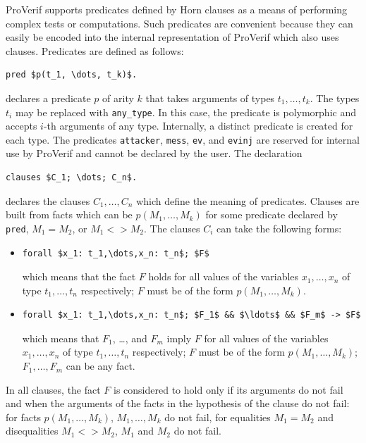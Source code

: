 \documentclass{book}
\begin{document}
ProVerif supports predicates defined by Horn clauses as a means of
performing complex tests or computations. Such predicates are
convenient because they can easily be encoded into the internal
representation of ProVerif which also uses clauses.
Predicates are defined as follows:
%
\begin{lstlisting}[numbers=none]
	pred $p(t_1, \dots, t_k)$.
\end{lstlisting}
%
declares a predicate $p$ of arity $k$ that takes arguments of types
$t_1,\ldots,t_k$. The types $t_i$ may be replaced with \lstinline!any_type!.
In this case, the predicate is polymorphic and accepts $i$-th arguments of any type. Internally, a distinct predicate is created for each type.
%
The predicates \lstinline{attacker},
\lstinline{mess}, \lstinline{ev}, and \lstinline{evinj} are reserved
for internal use by ProVerif and cannot be declared by the user.
The declaration
\begin{lstlisting}[numbers=none]
	clauses $C_1; \dots; C_n$.
\end{lstlisting}
declares the clauses $C_1, \dots, C_n$ which define the meaning of predicates.
Clauses are built from facts which can be $p(M_1, \ldots, M_k)$ for some
predicate declared by \lstinline!pred!, $M_1 = M_2$, or $M_1 <> M_2$.
The clauses $C_i$ can take the following forms:
\begin{itemize}
\item
\begin{lstlisting}[numbers=none]
forall $x_1: t_1,\dots,x_n: t_n$; $F$
\end{lstlisting}
which means that the fact $F$ holds for all values of the variables
$x_1, \ldots, x_n$ of type $t_1, \ldots, t_n$ respectively; $F$ must be of the form
$p(M_1, \ldots, M_k)$.
\item
\begin{lstlisting}[numbers=none]
forall $x_1: t_1,\dots,x_n: t_n$; $F_1$ && $\ldots$ && $F_m$ -> $F$
\end{lstlisting}
which means that $F_1$, \ldots, and $F_m$ imply $F$ for all values of
the variables $x_1, \ldots, x_n$ of type $t_1, \ldots, t_n$ respectively; $F$ must
be of the form $p(M_1, \ldots, M_k)$; $F_1, \ldots, F_m$ can be any
fact.

\end{itemize}
In all clauses, the fact $F$ is considered to hold only
if its arguments do not fail and when the arguments of the
facts in the hypothesis of the clause do not fail: for facts $p(M_1, \ldots, M_k)$,
$M_1, \ldots, M_k$ do not fail, for equalities $M_1 = M_2$ and disequalities $M_1 <> M_2$,
$M_1$ and $M_2$ do not fail.
\end{document}
